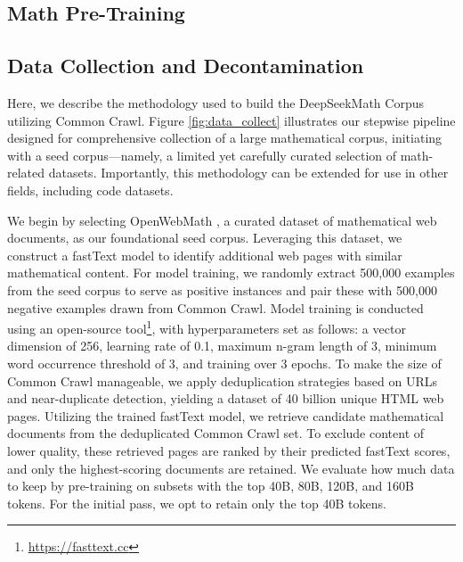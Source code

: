 \begin{itemize}[topsep=0pt]
\section{Math Pre-Training}

\subsection{Data Collection and Decontamination} 

Here, we describe the methodology used to build the DeepSeekMath Corpus utilizing Common Crawl. Figure \ref{fig:data_collect} illustrates our stepwise pipeline designed for comprehensive collection of a large mathematical corpus, initiating with a seed corpus—namely, a limited yet carefully curated selection of math-related datasets. Importantly, this methodology can be extended for use in other fields, including code datasets.

We begin by selecting OpenWebMath \citep{openwebmath}, a curated dataset of mathematical web documents, as our foundational seed corpus. Leveraging this dataset, we construct a fastText model \citep{joulin2016fasttext} to identify additional web pages with similar mathematical content. For model training, we randomly extract 500,000 examples from the seed corpus to serve as positive instances and pair these with 500,000 negative examples drawn from Common Crawl. Model training is conducted using an open-source tool\footnote{\url{https://fasttext.cc}}, with hyperparameters set as follows: a vector dimension of 256, learning rate of 0.1, maximum n-gram length of 3, minimum word occurrence threshold of 3, and training over 3 epochs. To make the size of Common Crawl manageable, we apply deduplication strategies based on URLs and near-duplicate detection, yielding a dataset of 40 billion unique HTML web pages. Utilizing the trained fastText model, we retrieve candidate mathematical documents from the deduplicated Common Crawl set. To exclude content of lower quality, these retrieved pages are ranked by their predicted fastText scores, and only the highest-scoring documents are retained. We evaluate how much data to keep by pre-training on subsets with the top 40B, 80B, 120B, and 160B tokens. For the initial pass, we opt to retain only the top 40B tokens.


\end{itemize}
